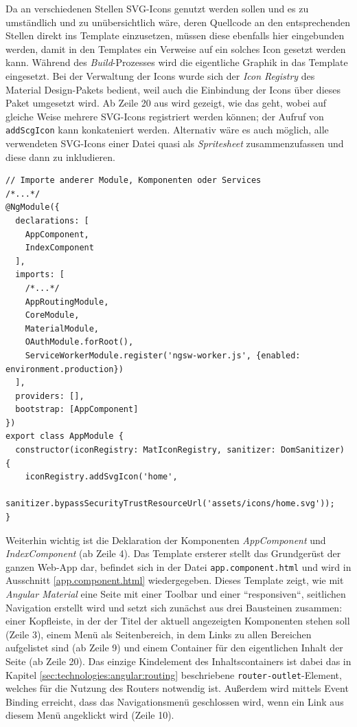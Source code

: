 Da an verschiedenen Stellen SVG-Icons genutzt werden sollen und es zu umständlich und zu unübersichtlich wäre, deren Quellcode an den entsprechenden Stellen direkt ins Template einzusetzen, müssen diese ebenfalls hier eingebunden werden, damit in den Templates ein Verweise auf ein solches Icon gesetzt werden kann. Während des \textit{Build}-Prozesses wird die eigentliche Graphik in das Template eingesetzt. Bei der Verwaltung der Icons wurde sich der \textit{Icon Registry} des Material Design-Pakets bedient, weil auch die Einbindung der Icons über dieses Paket umgesetzt wird. Ab Zeile 20 aus wird gezeigt, wie das geht, wobei auf gleiche Weise mehrere SVG-Icons registriert werden können; der Aufruf von \texttt{addScgIcon} kann konkateniert werden. Alternativ wäre es auch möglich, alle verwendeten SVG-Icons einer Datei quasi als \textit{Spritesheet} zusammenzufassen und diese dann zu inkludieren.

\begin{lstlisting}[float,floatplacement=h, style=htmlcssjs, caption={Ausschnitt aus \texttt{app.module.ts}}, label={appmodule.ts}]
// Importe anderer Module, Komponenten oder Services
/*...*/
@NgModule({
  declarations: [
    AppComponent,
    IndexComponent
  ],
  imports: [
	/*...*/	
    AppRoutingModule,
    CoreModule,
    MaterialModule,
    OAuthModule.forRoot(),
    ServiceWorkerModule.register('ngsw-worker.js', {enabled: environment.production})
  ],
  providers: [],
  bootstrap: [AppComponent]
})
export class AppModule {
  constructor(iconRegistry: MatIconRegistry, sanitizer: DomSanitizer) {
    iconRegistry.addSvgIcon('home',
      sanitizer.bypassSecurityTrustResourceUrl('assets/icons/home.svg'));
}
\end{lstlisting}

Weiterhin wichtig ist die Deklaration der Komponenten \textit{AppComponent} und \textit{IndexComponent} (ab Zeile 4). Das Template ersterer stellt das Grundgerüst der ganzen Web-App dar, befindet sich in der Datei \texttt{app.component.html} und wird in Ausschnitt \ref{app.component.html} wiedergegeben. Dieses Template zeigt, wie mit \textit{Angular Material} eine Seite mit einer Toolbar und einer ``responsiven``, seitlichen Navigation erstellt wird und setzt sich zunächst aus drei Bausteinen zusammen: einer Kopfleiste, in der der Titel der aktuell angezeigten Komponenten stehen soll (Zeile 3), einem Menü als Seitenbereich, in dem Links zu allen Bereichen aufgelistet sind (ab Zeile 9) und einem Container für den eigentlichen Inhalt der Seite (ab Zeile 20). Das einzige Kindelement des Inhaltscontainers ist dabei das in Kapitel \ref{sec:technologies:angular:routing} beschriebene \texttt{router-outlet}-Element, welches für die Nutzung des Routers notwendig ist. Außerdem wird mittels Event Binding erreicht, dass das Navigationsmenü geschlossen wird, wenn ein Link aus diesem Menü angeklickt wird (Zeile 10).

